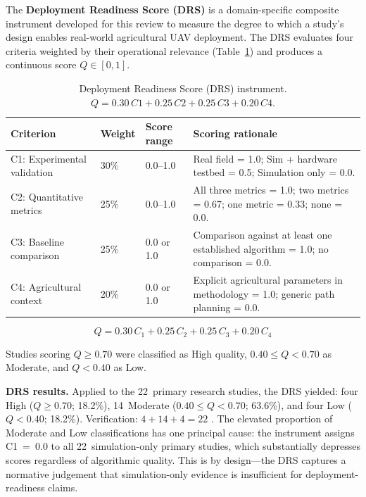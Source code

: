\documentclass[review,3p]{elsarticle}
\begin{document}
The \textbf{Deployment Readiness Score (DRS)} is a domain-specific composite
instrument developed for this review to measure the degree to which a study's
design enables real-world agricultural UAV deployment. The DRS evaluates four
criteria weighted by their operational relevance (Table~\ref{tab:quality_criteria})
and produces a continuous score $Q \in [0, 1]$.

\begin{table}[htbp]
\centering
\caption{Deployment Readiness Score (DRS) instrument. $Q = 0.30\,C1 + 0.25\,C2 + 0.25\,C3 + 0.20\,C4$.}
\label{tab:quality_criteria}
\begin{tabularx}{\textwidth}{lllX}
\toprule
\textbf{Criterion} & \textbf{Weight} & \textbf{Score range} & \textbf{Scoring rationale} \\
\midrule
C1: Experimental validation & 30\% & 0.0--1.0 & Real field = 1.0; Sim + hardware testbed = 0.5; Simulation only = 0.0. \\
C2: Quantitative metrics    & 25\% & 0.0--1.0 & All three metrics = 1.0; two metrics = 0.67; one metric = 0.33; none = 0.0. \\
C3: Baseline comparison     & 25\% & 0.0 or 1.0 & Comparison against at least one established algorithm = 1.0; no comparison = 0.0. \\
C4: Agricultural context    & 20\% & 0.0 or 1.0 & Explicit agricultural parameters in methodology = 1.0; generic path planning = 0.0. \\
\bottomrule
\end{tabularx}
\end{table}

\begin{equation}
Q = 0.30\,C_1 + 0.25\,C_2 + 0.25\,C_3 + 0.20\,C_4
\label{eq:drs}
\end{equation}

Studies scoring $Q \geq 0.70$ were classified as High quality,
$0.40 \leq Q < 0.70$ as Moderate, and $Q < 0.40$ as Low.

\textbf{DRS results.} Applied to the 22~primary research studies, the DRS
yielded: four High ($Q \geq 0.70$; 18.2\%), 14~Moderate ($0.40 \leq Q < 0.70$;
63.6\%), and four Low ($Q < 0.40$; 18.2\%). Verification: $4+14+4=22$ \checkmark.
The elevated proportion of Moderate and Low classifications has one principal
cause: the instrument assigns C1~=~0.0 to all 22~simulation-only primary
studies, which substantially depresses scores regardless of algorithmic quality.
This is by design---the DRS captures a normative judgement that simulation-only
evidence is insufficient for deployment-readiness claims.
\end{document}
